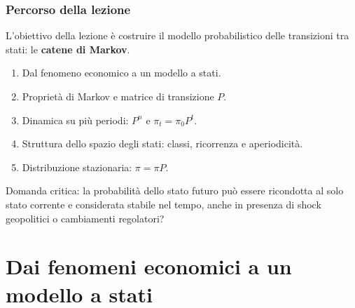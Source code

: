 \documentclass[handout]{beamer}%
\newenvironment{stepenumerate}{\begin{enumerate}[<+->]}{\end{enumerate}}
\providecommand{\QTR}[2]{\csname #1\endcsname{#2}}
\begin{document}
\begin{frame}%
%

\frametitle{Percorso della lezione}%
%

%


L'obiettivo della lezione \`{e} costruire il modello probabilistico delle
transizioni tra stati: le \textbf{catene di Markov}.

\medskip

\begin{stepenumerate}
\item[1.] Dal fenomeno economico a un modello a stati.

\item[2.] Propriet\`{a} di Markov e matrice di transizione $P$.

\item[3.] Dinamica su pi\`{u} periodi: $P^{n}$ e $\pi_{t}=\pi_{0}P^{t}$.

\item[4.] Struttura dello spazio degli stati: classi, ricorrenza e aperiodicit\`{a}.

\item[5.] Distribuzione stazionaria: $\pi=\pi P$.
\end{stepenumerate}

\medskip

\begin{center}
{\small Domanda critica: la probabilit\`{a} dello stato futuro pu\`{o} essere
ricondotta al solo stato corrente e considerata stabile nel tempo, anche in
presenza di shock geopolitici o cambiamenti regolatori?}
\end{center}%

\transboxout
\end{frame}%




\section{Dai fenomeni economici a un modello a stati}
\end{document}
